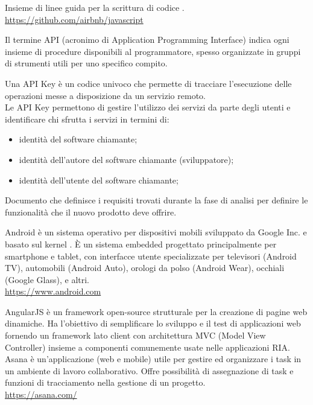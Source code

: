 Insieme di linee guida per la scrittura di codice .\\
\url{https://github.com/airbnb/javascript}

Il termine API (acronimo di Application Programming Interface) indica ogni insieme di procedure disponibili al programmatore, spesso organizzate in gruppi di strumenti utili per uno specifico compito.

Una API Key è un codice univoco che permette di tracciare l'esecuzione delle operazioni messe a disposizione da un servizio remoto.\\ 
Le API Key permettono di gestire l'utilizzo dei servizi da parte degli utenti e identificare chi sfrutta i servizi in termini di:
\begin{itemize}
  \item identità del software chiamante;
  \item identità dell'autore del software chiamante (sviluppatore);
  \item identità dell'utente del software chiamante;
\end{itemize}

Documento che definisce i requisiti trovati durante la fase di analisi per definire le funzionalità che il nuovo prodotto deve offrire.

Android è un sistema operativo per dispositivi mobili sviluppato da Google Inc. e basato sul kernel . \`{E} un sistema embedded progettato principalmente per smartphone e tablet, con interfacce utente specializzate per televisori (Android TV), automobili (Android Auto), orologi da polso (Android Wear), occhiali (Google Glass), e altri.\\
\url{https://www.android.com}

AngularJS è un framework open-source strutturale per la creazione di pagine web dinamiche. Ha l'obiettivo di semplificare lo sviluppo e il test di applicazioni web fornendo un framework lato client con architettura MVC (Model View Controller) insieme a componenti comunemente usate nelle applicazioni RIA.\\

Asana è un’applicazione (web e mobile) utile per gestire ed organizzare i task in un ambiente di lavoro collaborativo. Offre possibilità di assegnazione di task e funzioni di tracciamento nella gestione di un progetto.\\
\url{https://asana.com/}
\clearpage
